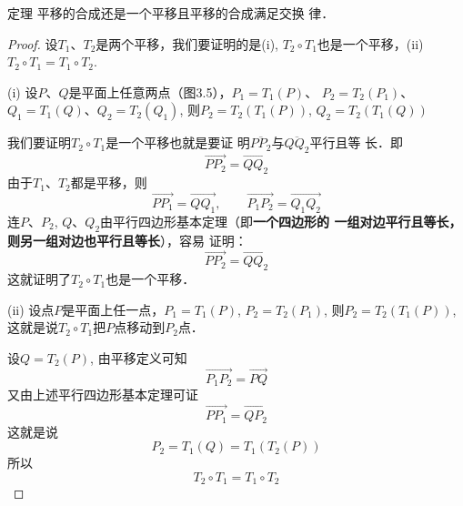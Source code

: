 \begin{blk}{定理}
    平移的合成还是一个平移且平移的合成满足交换
律．
\end{blk}

\begin{proof}
设$T_1$、$T_2$是两个平移，我们要证明的是(i), $T_2\circ T_1$也是一个平移，(ii) $T_2\circ T_1=T_1\circ T_2$.

(i) 设$P$、$Q$是平面上任意两点（图3.5），$P_1=T_1(P)$、
$P_2=T_2(P_1)$、$Q_1=T_1(Q)$、$Q_2=T_2(Q_1)$, 则$P_2=T_2(T_1(P))$, $Q_2=T_2(T_1(Q))$
\begin{figure}[htp]
    \centering
{}
    \caption{}
\end{figure}

我们要证明$T_2\circ T_1$是一个平移也就是要证
明$\overline{PP_2}$与$\overline{QQ_2}$平行且等
长．即
\[\Vec{PP_2}=\Vec{QQ_2}\]
由于$T_1$、$T_2$都是平移，则
\[\Vec{PP_1}=\Vec{QQ_1},\qquad \Vec{P_1P_2}=\Vec{Q_1Q_2}\]
连$P$、$P_2$, $Q$、$Q_2$由平行四边形基本定理（即\textbf{一个四边形的
一组对边平行且等长，则另一组对边也平行且等长}），容易
证明：
\[\Vec{PP_2}=\Vec{QQ_2}\]
这就证明了$T_2\circ T_1$也是一个平移．



(ii) 设点$P$是平面上任一点，$P_1=T_1(P)$, $P_2=T_2(P_1)$,
则$P_2=T_2(T_1(P))$, 这就是说$T_2\circ T_1$把$P$点移动到$P_2$点．

设$Q=T_2(P)$, 由平移定义可知
\[\Vec{P_1P_2}=\Vec{PQ}\]
又由上述平行四边形基本定理可证
\[\Vec{PP_1}=\Vec{QP_2}\]
这就是说
\[P_2=T_1(Q)=T_1(T_2(P))\]
所以
\[T_2\circ T_1=T_1\circ T_2\]
\end{proof}

